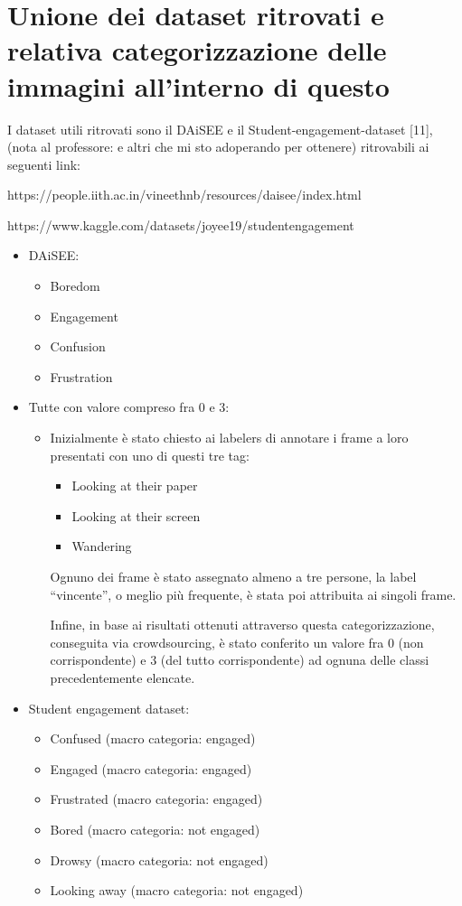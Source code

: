 \newpage

\section{Unione dei dataset ritrovati e relativa categorizzazione delle immagini all’interno di questo}

I dataset utili ritrovati sono il DAiSEE \cite{StudEngagDataset} e il Student-engagement-dataset [11], (nota al professore: e altri che mi sto adoperando per ottenere) ritrovabili ai seguenti link:

https://people.iith.ac.in/vineethnb/resources/daisee/index.html

https://www.kaggle.com/datasets/joyee19/studentengagement

\begin{itemize}
    \item DAiSEE:
    \begin{itemize}
        \item Boredom
        \item Engagement
        \item Confusion
        \item Frustration
    \end{itemize}
    \item Tutte con valore compreso fra 0 e 3:
    \begin{itemize}
        \item Inizialmente è stato chiesto ai labelers di annotare i frame a loro presentati con uno di questi tre tag:
        \begin{itemize}
            \item Looking at their paper
            \item Looking at their screen
            \item Wandering
        \end{itemize}
            
        Ognuno dei frame è stato assegnato almeno a tre persone, la label “vincente”, o meglio più frequente, è stata poi attribuita ai singoli frame.

        Infine, in base ai risultati ottenuti attraverso questa categorizzazione, conseguita via crowdsourcing, è stato conferito un valore fra 0 (non corrispondente) e 3 (del tutto corrispondente) ad ognuna delle classi precedentemente elencate.
    \end{itemize}
    \item Student engagement dataset:
    \begin{itemize}
        \item Confused (macro categoria: engaged)
        \item Engaged (macro categoria: engaged)
        \item Frustrated (macro categoria: engaged)
        \item Bored (macro categoria: not engaged)
        \item Drowsy (macro categoria: not engaged)
        \item Looking away (macro categoria: not engaged)
    \end{itemize}
\end{itemize}

